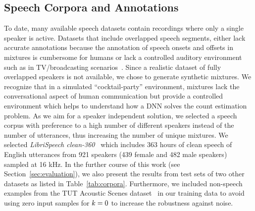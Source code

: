 \subsection{Speech Corpora and Annotations}%
\label{ssec:corpus}
To date, many available speech datasets contain recordings where only a single speaker is active.
Datasets that include overlapped speech segments, either lack accurate annotations because the annotation of speech onsets and offsets in mixtures is cumbersome for humans or lack a controlled auditory environment such as in TV/broadcasting scenarios~\cite{Gravier12}.
Since a realistic dataset of fully overlapped speakers is not available, we chose to generate synthetic mixtures.
We recognize that in a simulated ``cocktail-party'' environment, mixtures lack the conversational aspect of human communication but provide a controlled environment which helps to understand how a DNN solves the count estimation problem.
As we aim for a speaker independent solution, we selected a speech corpus with preference to a high number of different speakers instead of the number of utterances, thus increasing the number of unique mixtures.
We selected \emph{LibriSpeech clean-360}\ \cite{panayotov15} which includes 363 hours of clean speech of English utterances from 921 speakers (439 female and 482 male speakers) sampled at 16 kHz.
In the further course of this work (see Section~\ref{sec:evaluation}), we also present the results from test sets of two other datasets as listed in Table~\ref{tab:corpora}.
Furthermore, we included non-speech examples from the TUT Acoustic Scenes dataset~\cite{Mesaros16} in our training data to avoid using zero input samples for \(k = 0\) to increase the robustness against noise.


